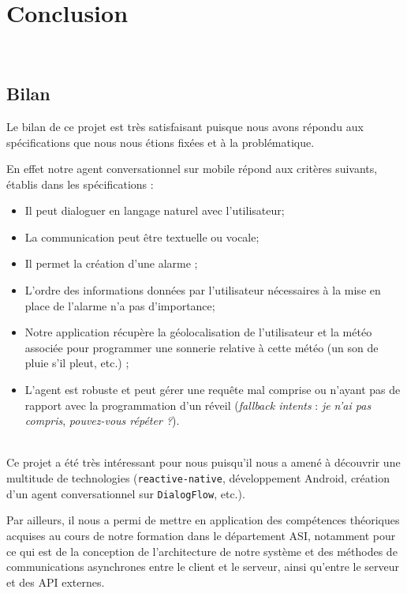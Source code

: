 \chapter*{Conclusion}
\thispagestyle{plain}
~\\[0.5cm]
{ \large

\section{Bilan}
Le bilan de ce projet est très satisfaisant puisque nous avons répondu aux spécifications que nous nous étions fixées et à la problématique. 

En effet notre agent conversationnel sur mobile répond aux critères suivants, établis dans les spécifications :
\begin{itemize}
	\item Il peut dialoguer en langage naturel avec l'utilisateur;
	\item La communication peut être textuelle ou vocale;
	\item Il permet la création d'une alarme ;
	\item L'ordre des informations données par l'utilisateur nécessaires à la mise en place de l'alarme n'a pas d'importance;
	\item Notre application récupère la géolocalisation de l'utilisateur et la météo associée pour programmer une sonnerie relative à cette météo (un son de pluie s'il pleut, etc.) ;
	\item L'agent est robuste et peut gérer une requête mal comprise ou n'ayant pas de rapport avec la programmation d'un réveil (\emph{fallback intents} : \og\emph{je n'ai pas compris}\fg, \og\emph{pouvez-vous répéter ?}\fg).
\end{itemize}

~\\\indent
Ce projet a été très intéressant pour nous puisqu'il nous a amené à découvrir une multitude de technologies (\texttt{reactive-native}, développement Android, création d'un agent conversationnel sur \texttt{DialogFlow}, etc.). 

Par ailleurs, il nous a permi de mettre en application des compétences théoriques acquises au cours de notre formation dans le département ASI, notamment pour ce qui est de la conception de l'architecture de notre système et des méthodes de communications asynchrones entre le client et le serveur, ainsi qu'entre le serveur et des API externes.

}
